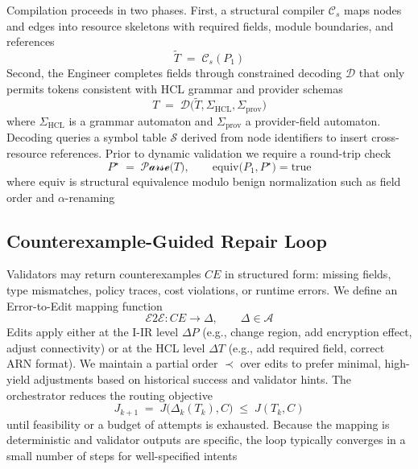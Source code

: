 \documentclass[manuscript,screen,nonacm]{acmart}
\begin{document}
Compilation proceeds in two phases. First, a structural compiler $\mathcal{C}_s$ maps nodes and edges into resource skeletons with required fields, module boundaries, and references
\begin{equation}
\widetilde{T} \;=\; \mathcal{C}_s(P_1)
\end{equation}
Second, the Engineer completes fields through constrained decoding $\mathcal{D}$ that only permits tokens consistent with HCL grammar and provider schemas
\begin{equation}
T \;=\; \mathcal{D}\big(\widetilde{T}, \Sigma_{\text{HCL}}, \Sigma_{\text{prov}}\big)
\end{equation}
where $\Sigma_{\text{HCL}}$ is a grammar automaton and $\Sigma_{\text{prov}}$ a provider-field automaton. Decoding queries a symbol table $\mathcal{S}$ derived from node identifiers to insert cross-resource references. Prior to dynamic validation we require a round-trip check
\begin{equation}
P^\star \;=\; \mathcal{P\!arse}\big(T\big),\qquad \mathrm{equiv}\big(P_1, P^\star\big) = \text{true}
\end{equation}
where $\mathrm{equiv}$ is structural equivalence modulo benign normalization such as field order and $\alpha$-renaming

\subsection{Counterexample-Guided Repair Loop}
\label{sec:repair}

Validators may return counterexamples $CE$ in structured form: missing fields, type mismatches, policy traces, cost violations, or runtime errors. We define an Error-to-Edit mapping function
\begin{equation}
\mathcal{E2E}: CE \rightarrow \Delta,\qquad \Delta \in \mathcal{A}
\end{equation}
Edits apply either at the I-IR level $\Delta P$ (e.g., change region, add encryption effect, adjust connectivity) or at the HCL level $\Delta T$ (e.g., add required field, correct ARN format). We maintain a partial order $\prec$ over edits to prefer minimal, high-yield adjustments based on historical success and validator hints. The orchestrator reduces the routing objective
\begin{equation}
J_{k+1} \;=\; J\big(\Delta_k(T_k), C\big) \;\le\; J(T_k, C)
\end{equation}
until feasibility or a budget of attempts is exhausted. Because the mapping is deterministic and validator outputs are specific, the loop typically converges in a small number of steps for well-specified intents
\end{document}
